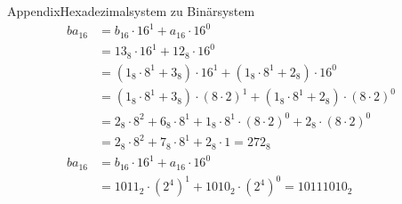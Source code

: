 \begin{frame}[allowframebreaks]{Appendix}{Hexadezimalsystem zu Binärsystem}
  \begin{align*}
    ba_{16} &= b_{16} \cdot 16^1 + a_{16} \cdot 16^0\\
            &= 13_{8} \cdot 16^1 + 12_{8} \cdot 16^0\\
      &= (1_{8} \cdot 8^1 + 3_{8}) \cdot 16^1 + (1_{8} \cdot 8^1+  2_{8}) \cdot 16^0\\
      &= (1_{8} \cdot 8^1 + 3_{8}) \cdot (8 \cdot 2)^1 + (1_{8} \cdot 8^1+  2_{8}) \cdot (8 \cdot 2)^0\\
      &= 2_{8} \cdot 8^2 + 6_{8} \cdot 8^1 + 1_{8} \cdot 8^1 \cdot (8 \cdot 2)^0 + 2_{8} \cdot (8 \cdot 2)^0\\
      &= 2_{8} \cdot 8^2 + 7_{8} \cdot 8^1 + 2_{8} \cdot 1 = 272_{8} \\
      ba_{16} &= b_{16} \cdot 16^1 + a_{16} \cdot 16^0\\
              &= 1011_{2} \cdot (2^4)^1 + 1010_{2} \cdot (2^4)^0 = 10111010_{2}
  \end{align*}
\end{frame}

